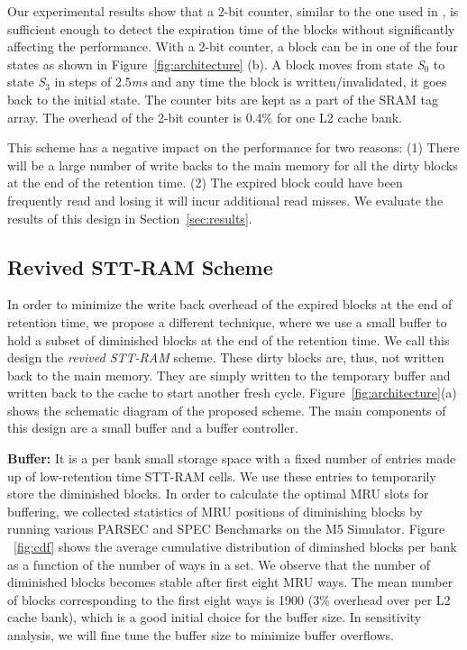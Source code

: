 Our experimental results show that a 2-bit counter, similar to the one used in \cite{cache-decay-2001},
is sufficient enough to detect the expiration time of the blocks without significantly affecting the performance.
With a 2-bit counter, a block can be in one of the four states as shown in Figure~\ref{fig:architecture} (b).
A block moves from state {\it S$_0$} to state {\it S$_3$} in steps of 2.5{\it ms} and any time the block is written/invalidated, it
goes back to the initial state.  The counter bits are kept as a part of the SRAM tag array.
The overhead of the 2-bit counter is 0.4\% for one L2 cache bank.

This scheme has a negative impact on the performance for two reasons: (1) There will be  a large number of write
backs to the main memory for all the dirty blocks at the end of the retention time.
(2) The expired block could have been frequently read and losing it will incur additional read misses.
We evaluate the results of this design in Section~\ref{sec:results}.


\subsection{{Revived STT-RAM Scheme}}
In order to minimize the write back overhead of the expired blocks at the end of retention time, we propose
a different technique, where we use a small buffer to hold a subset of diminished blocks at the end of the retention
time. We call this design the {\it revived STT-RAM} scheme. These dirty blocks are, thus, not written back to the main memory. They are simply written to the temporary buffer and
written back to the cache to start another fresh cycle.
Figure~\ref{fig:architecture}(a) shows the schematic diagram of the proposed scheme.
The main components of this design are a small buffer and a buffer controller.

\noindent\textbf{Buffer:}
It is a per bank small storage space with a fixed number of entries made up of low-retention time STT-RAM cells.
We use these entries to temporarily store the diminished blocks. In order to calculate the optimal MRU slots for buffering,
we collected statistics of MRU positions of diminishing blocks by running various PARSEC and SPEC Benchmarks on the M5 Simulator.
Figure ~\ref{fig:cdf} shows the average cumulative distribution of diminshed blocks per bank
as a function of the number of ways in a set. We observe that the number of diminished blocks becomes stable
after first eight MRU ways. The mean number of blocks corresponding to the first eight ways is 1900
(3\% overhead over per L2 cache bank),
which is a good initial choice for the buffer size. In sensitivity analysis, we will fine tune the buffer size
to minimize buffer overflows.

